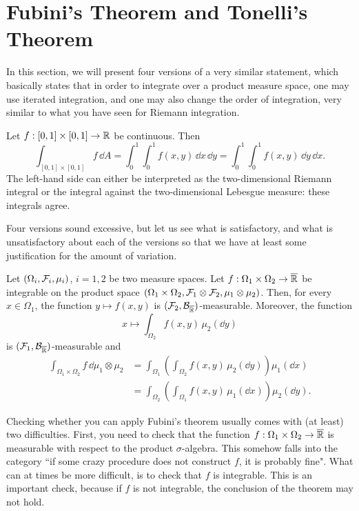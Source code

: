 \section{Fubini's Theorem and Tonelli's Theorem}

In this section, we will present four versions of a very similar statement, which basically states that in order to integrate over a product measure space, one may use iterated integration, and one may also change the order of integration, very similar to what you have seen for Riemann integration.

\begin{example}
	Let $f: [0,1]\times[0,1] \to \mathbb R$ be continuous. Then  
	\[
	\int_{[0,1]\times[0,1]} f\, \dd A = \int_0^1\!\! \int_0^1 f(x,y)\, \dd x\, \dd y = \int_0^1\!\! \int_0^1 f(x,y)\, \dd y \,\dd x.
	\]	
	The left-hand side can either be interpreted as the two-dimensional Riemann integral or the integral against the two-dimensional Lebesgue measure: these integrals agree. 
\end{example}

Four versions sound excessive, but let us see what is satisfactory, and what is unsatisfactory about each of the versions so that we have at least some justification for the amount of variation.

\begin{theorem}
Let $(\Omega_i, \mathcal F_i, \mu_i)$, $i=1,2$ be two measure spaces. 
Let $f : \Omega_1 \times \Omega_2 \to \overline{\mathbb R}$ be integrable on the product space $(\Omega_1 \times \Omega_2, \mathcal F_1 \otimes \mathcal F_2, \mu_1 \otimes \mu_2)$. Then, for every $x \in \Omega_1$, the function $y \mapsto f(x, y)$ is $(\mathcal F_2,\mathcal B_{\overline{\mathbb R}})$-measurable. Moreover, the function 
\[
x \mapsto \int_{\Omega_2} f(x,y)\,  \mu_2(\dd y)
\]
is $(\mathcal F_1,\mathcal B_{\overline{\mathbb R}})$-measurable and
\[
\begin{split}
\int_{\Omega_1 \times \Omega_2} f\, \dd \mu_1 \otimes \mu_2 
&= \int_{\Omega_1} \left( \int_{\Omega_2 } f(x,  y ) \,\mu_2(\dd y) \right) \mu_1(\dd x)\\
&= \int_{\Omega_2} \left( \int_{\Omega_1} f(x, y) \, \mu_1(\dd x) \right) \mu_2(\dd y).
\end{split}
\] 
\end{theorem}

Checking whether you can apply Fubini's theorem usually comes with (at least) two difficulties. First, you need to check that the function $f: \Omega_1 \times \Omega_2 \to \overline{\mathbb R}$ is measurable with respect to the product $\sigma$-algebra. This somehow falls into the category ``if some crazy procedure does not construct $f$, it is probably fine". What can at times be more difficult, is to check that $f$ is integrable. This is an important check, because if $f$ is not integrable, the conclusion of the theorem may not hold.

